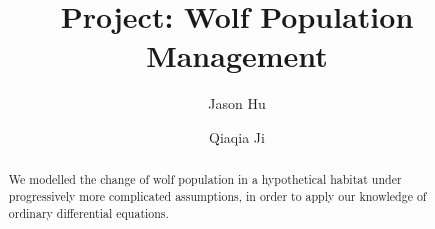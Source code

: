 \documentclass{amsart}
\theoremstyle{definition}
\theoremstyle{remark}
\numberwithin{equation}{section}
\begin{document}
\title{Project: Wolf Population Management}

\author{Jason Hu}
\author{Qiaqia Ji}





\begin{abstract}
We modelled the change of wolf population in a hypothetical habitat under progressively more complicated assumptions, in order to apply our knowledge of ordinary differential equations.
\end{abstract}

\maketitle


\end{document}

